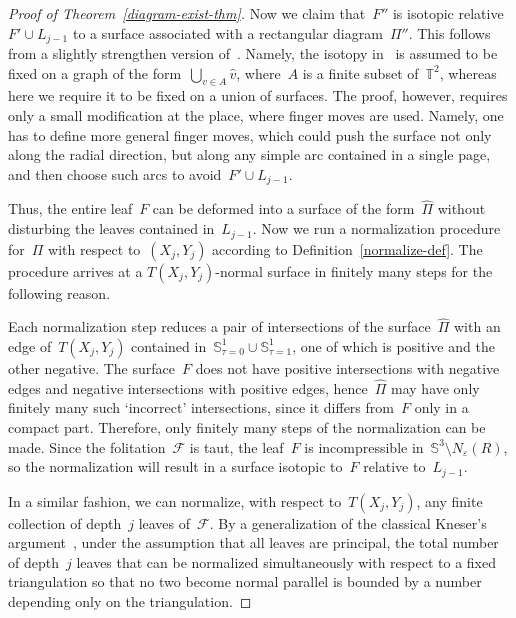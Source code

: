 \documentclass{amsart}
\theoremstyle{theorem}
\theoremstyle{remark}
\theoremstyle{definition}
\numberwithin{equation}{section}
\numberwithin{figure}{section}
\begin{document}
\begin{proof}[Proof of Theorem~\ref{diagram-exist-thm}]
Now we claim that~$F''$ is isotopic relative~$F'\cup L_{j-1}$ to a surface associated with a rectangular
diagram~$\Pi''$. This follows from a slightly strengthen version of~\cite[Proposition~5]{Representability}. Namely,
the isotopy in~\cite{Representability} is assumed to be fixed on a graph of the form~$\bigcup_{v\in A}\widehat v$,
where~$A$ is a finite subset of~$\mathbb T^2$, whereas here we require it to be fixed on a union of surfaces.
The proof, however, requires only a small modification at the place, where finger moves are used. Namely, one
has to define more general finger moves, which could push the surface not only along the radial direction,
but along any simple arc contained in a single page, and then choose such arcs to avoid~$F'\cup L_{j-1}$.

Thus, the entire leaf~$F$ can be deformed into a surface of the form~$\widehat\Pi$ without
disturbing the leaves contained in~$L_{j-1}$. Now we run a normalization procedure for~$\Pi$
with respect to~$(X_j,Y_j)$ according to Definition~\ref{normalize-def}. The procedure arrives
at a $T(X_j,Y_j)$-normal surface in finitely many steps for the following reason.

Each normalization step reduces a pair of intersections of the surface~$\widehat\Pi$ with an edge of~$T(X_j,Y_j)$
contained in~$\mathbb S^1_{\tau=0}\cup\mathbb S^1_{\tau=1}$, one of which is positive and the other negative.
The surface~$F$ does not have positive intersections with negative edges and negative intersections
with positive edges, hence~$\widehat\Pi$ may have only finitely many such `incorrect' intersections, since it differs from~$F$
only in a compact part.
Therefore, only finitely many steps of the normalization can be made.
Since the folitation~$\mathscr F$ is taut, the leaf~$F$ is incompressible in~$\mathbb S^3\setminus N_\varepsilon(R)$, so the normalization will result in a surface isotopic to~$F$
relative to~$L_{j-1}$.

In a similar fashion, we can normalize, with respect to~$T(X_j,Y_j)$, any finite collection of depth~$j$ leaves of~$\mathscr F$.
By a generalization of the classical Kneser's argument~\cite{kneser}, under the assumption
that all leaves are principal, the total number of depth~$j$
leaves that can be normalized simultaneously with respect to a fixed triangulation so that no two become normal parallel
is bounded by a number depending only on the triangulation.


\end{proof}
\end{document}
